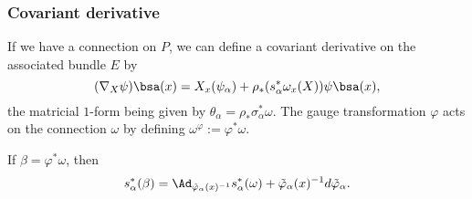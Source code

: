 \subsubsection{Covariant derivative}

If we have a connection on $P$, we can define a covariant derivative on the associated bundle $E$ by
\[
	(\nabla_X\psi)\bsa(x)=X_x(\psi_{\alpha})+\rho_*( s_{\alpha}^*\omega_x(X) )\psi\bsa(x),
\]
the matricial $1$-form being given by $\theta_{\alpha}=\rho_*\sigma^*_{\alpha}\omega$. The gauge transformation $\varphi$ acts on the connection $\omega$ by defining $\omega^{\varphi}:=\varphi^*\omega$.

\begin{proposition}
	If $\beta=\varphi^*\omega$, then
	\[
		s^*_{\alpha}(\beta)=\Ad_{\tilde{\varphi}_{\alpha}(x)^{-1}}s^*_{\alpha}(\omega)+\tilde{\varphi}_{\alpha}(x)^{-1} d\tilde{\varphi}_{\alpha}.
	\]
\end{proposition}

